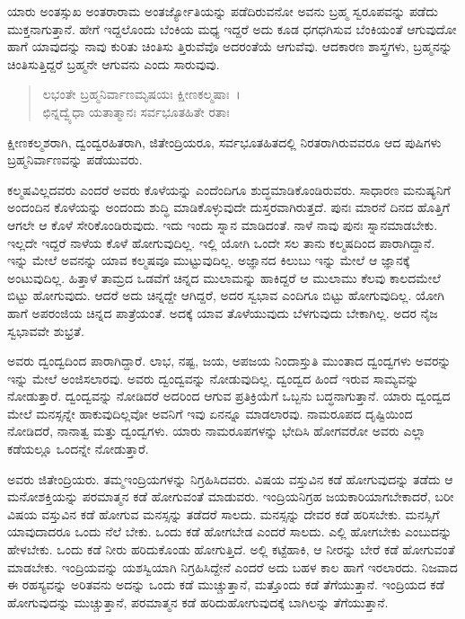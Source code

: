 ಯಾರು ಅಂತಸ್ಸುಖ ಅಂತರಾರಾಮ ಅಂತರ್ಜ್ಯೋತಿಯನ್ನು ಪಡೆದಿರುವನೋ ಅವನು ಬ್ರಹ್ಮ ಸ್ವರೂಪವನ್ನು ಪಡೆದು ಮುಕ್ತನಾಗುತ್ತಾನೆ. ಹೇಗೆ ಇದ್ದಲೊಂದು ಬೆಂಕಿಯ ಮಧ್ಯ ಇದ್ದರೆ ಅದು ಕೂಡ ಧಗಧಗಿಸುವ ಬೆಂಕಿಯಂತೆ ಆಗುವುದೋ ಹಾಗೆ ಯಾವುದನ್ನು ನಾವು ಕುರಿತು ಚಿಂತಿಸು ತ್ತಿರುವೆವೊ ಅದರಂತೆಯೆ ಆಗುವೆವು. ಆದಕಾರಣ ಶಾಸ್ತ್ರಗಳು, ಬ್ರಹ್ಮನನ್ನು ಚಿಂತಿಸುತ್ತಿದ್ದರೆ ಬ್ರಹ್ಮನೇ ಆಗುವನು ಎಂದು ಸಾರುವುವು.

\begin{verse}
ಲಭಂತೇ ಬ್ರಹ್ಮನಿರ್ವಾಣಮೃಷಯಃ ಕ್ಷೀಣಕಲ್ಮಷಾಃ~।\\ಛಿನ್ನದ್ವ್ಯೆಧಾ ಯತಾತ್ಮಾನಃ ಸರ್ವಭೂತಹಿತೇ ರತಾಃ 
\end{verse}

{\small ಕ್ಷೀಣಕಲ್ಮಶರಾಗಿ, ದ್ವಂದ್ವರಹಿತರಾಗಿ, ಜಿತೇಂದ್ರಿಯರೂ, ಸರ್ವಭೂತಹಿತದಲ್ಲಿ ನಿರತರಾಗಿರುವವರೂ ಆದ ಪುಷಿಗಳು ಬ್ರಹ್ಮನಿರ್ವಾಣವನ್ನು ಪಡೆಯುವರು.}

ಕಲ್ಮಷವಿಲ್ಲದವರು ಎಂದರೆ ಅವರು ಕೊಳೆಯನ್ನು ಎಂದೆಂದಿಗೂ ಶುದ್ಧಮಾಡಿಕೊಂಡಿರುವರು. ಸಾಧಾರಣ ಮನುಷ್ಯನಿಗೆ ಅಂದಂದಿನ ಕೊಳೆಯನ್ನು ಅಂದಂದು ಶುದ್ಧಿ ಮಾಡಿಕೊಳ್ಳುವುದೇ ದುಸ್ತರವಾಗಿರುತ್ತದೆ. ಪುನಃ ಮಾರನೆ ದಿನದ ಹೊತ್ತಿಗೆ ಆಗಲೇ ಆ ಕೊಳೆ ಸೇರಿಕೊಂಡಿರುವುದು. ಇದು ಇಂದು ಸ್ನಾನ ಮಾಡಿದಂತೆ. ನಾಳೆ ನಾವು ಪುನಃ ಸ್ನಾನಮಾಡಬೇಕು. ಇಲ್ಲದೇ ಇದ್ದರೆ ನಾಳೆಯ ಕೊಳೆ ಹೋಗುವುದಿಲ್ಲ. ಇಲ್ಲಿ ಯೋಗಿ ಒಂದೇ ಸಲ ತಾನು ಕಲ್ಮಷದಿಂದ ಪಾರಾಗಿದ್ದಾನೆ. ಇನ್ನು ಮೇಲೆ ಅವನನ್ನು ಯಾವ ಕಲ್ಮಷವೂ ಮುಟ್ಟುವುದಿಲ್ಲ. ಅಜ್ಞಾನದ ಕಿಲುಬು ಇನ್ನು ಮೇಲೆ ಆ ಜ್ಞಾನಕ್ಕೆ ಅಂಟುವುದಿಲ್ಲ. ಹಿತ್ತಾಳೆ ತಾಮ್ರದ ಒಡವೆಗೆ ಚಿನ್ನದ ಮುಲಾಮನ್ನು ಹಾಕಿದ್ದರೆ ಆ ಮುಲಾಮು ಕೆಲವು ಕಾಲದಮೇಲೆ ಬಿಟ್ಟು ಹೋಗುವುದು. ಆದರೆ ಅದು ಚಿನ್ನದ್ದೇ ಆಗಿದ್ದರೆ, ಅದರ ಸ್ವಭಾವ ಎಂದಿಗೂ ಬಿಟ್ಟು ಹೋಗುವುದಿಲ್ಲ. ಯೋಗಿ ಹಾಗೆ ಅಪರಂಜಿಯ ಚಿನ್ನದ ಪಾತ್ರೆಯಂತೆ. ಅದಕ್ಕೆ ಯಾವ ತೊಳೆಯುವುದು ಬೆಳಗುವುದು ಬೇಕಾಗಿಲ್ಲ. ಅದರ ನೈಜ ಸ್ವಭಾವವೇ ಶುಭ್ರತೆ.

ಅವರು ದ್ವಂದ್ವದಿಂದ ಪಾರಾಗಿದ್ದಾರೆ. ಲಾಭ, ನಷ್ಟ, ಜಯ, ಅಪಜಯ ನಿಂದಾಸ್ತುತಿ ಮುಂತಾದ ದ್ವಂದ್ವಗಳು ಅವರನ್ನು ಇನ್ನು ಮೇಲೆ ಅಂಜಿಸಲಾರವು. ಅವರು ದ್ವಂದ್ವವನ್ನು ನೋಡುವುದಿಲ್ಲ. ದ್ವಂದ್ವದ ಹಿಂದೆ ಇರುವ ಸಾಮ್ಯವನ್ನು ನೋಡುತ್ತಾರೆ. ದ್ವಂದ್ವವನ್ನು ನೋಡಿದರೆ ಅದರಿಂದ ಆಗುವ ಪ್ರತಿಕ್ರಿಯೆಗೆ ಒಬ್ಬನು ಬದ್ಧನಾಗುತ್ತಾನೆ. ಯಾರು ದ್ವಂದ್ವದ ಮೇಲೆ ಮನಸ್ಸನ್ನೇ ಹಾಕುವುದಿಲ್ಲವೋ ಅವನಿಗೆ ಇವು ಏನನ್ನೂ ಮಾಡಲಾರವು. ನಾಮರೂಪದ ದೃಷ್ಟಿಯಿಂದ ನೋಡಿದರೆ, ನಾನಾತ್ವ ಮತ್ತು ದ್ವಂದ್ವಗಳು. ಯಾರು ನಾಮರೂಪಗಳನ್ನು ಭೇದಿಸಿ ಹೋಗವರೋ ಅವರು ಎಲ್ಲಾ ಕಡೆಯಲ್ಲೂ ಒಂದನ್ನೇ ನೋಡುತ್ತಾರೆ.

ಅವರು ಜಿತೇಂದ್ರಿಯರು. ತಮ್ಮಇಂದ್ರಿಯಗಳನ್ನು ನಿಗ್ರಹಿಸಿದವರು. ವಿಷಯ ವಸ್ತುವಿನ ಕಡೆ ಹೋಗುವುದನ್ನು ತಡೆದು ಆ ಮನೋಶಕ್ತಿಯನ್ನು ಪರಮಾತ್ಮನ ಕಡೆ ಹೋಗುವಂತೆ ಮಾಡುವರು. ಇಂದ್ರಿಯನಿಗ್ರಹ ಜಯಕಾರಿಯಾಗಬೇಕಾದರೆ, ಬರೀ ವಿಷಯ ವಸ್ತುವಿನ ಕಡೆ ಹೋಗುವ ಮನಸ್ಸನ್ನು ತಡೆದರೆ ಸಾಲದು. ಮನಸ್ಸನ್ನು ದೇವರ ಕಡೆ ಹರಿಸಬೇಕು. ಮನಸ್ಸಿಗೆ ಯಾವುದಾದರೂ ಒಂದು ನೆಲೆ ಬೇಕು. ಒಂದು ಕಡೆ ಹೋಗಬೇಡ ಎಂದರೆ ಸಾಲದು. ಎಲ್ಲಿ ಹೋಗಬೇಕು ಎಂಬುದನ್ನು ಹೇಳಬೇಕು. ಒಂದು ಕಡೆ ನೀರು ಹರಿದುಕೊಂಡು ಹೋಗುತ್ತಿದೆ. ಅಲ್ಲಿ ಕಟ್ಟೆಹಾಕಿ, ಆ ನೀರನ್ನು ಬೇರೆ ಕಡೆ ಹೋಗುವಂತೆ ಮಾಡಬೇಕು. ಇಂದ್ರಿಯವನ್ನು ಯಶಸ್ವಿಯಾಗಿ ನಿಗ್ರಹಿಸಿದ್ದೇನೆ ಎಂದರೆ ಅದು ಬಹಳ ಕಾಲ ಹಾಗೆ ಇರಲಾರದು. ನಿಜವಾದ ಈ ರಹಸ್ಯವನ್ನು ಅರಿತವನು ಅದನ್ನು ಒಂದು ಕಡೆ ಮುಚ್ಚುತ್ತಾನೆ, ಮತ್ತೊಂದು ಕಡೆ ತೆಗೆಯುತ್ತಾನೆ. ಇಂದ್ರಿಯದ ಕಡೆ ಹೋಗುವುದನ್ನು ಮುಚ್ಚುತ್ತಾನೆ, ಪರಮಾತ್ಮನ ಕಡೆ ಹರಿದುಹೋಗುವುದಕ್ಕೆ ಬಾಗಿಲನ್ನು ತೆಗೆಯುತ್ತಾನೆ.

